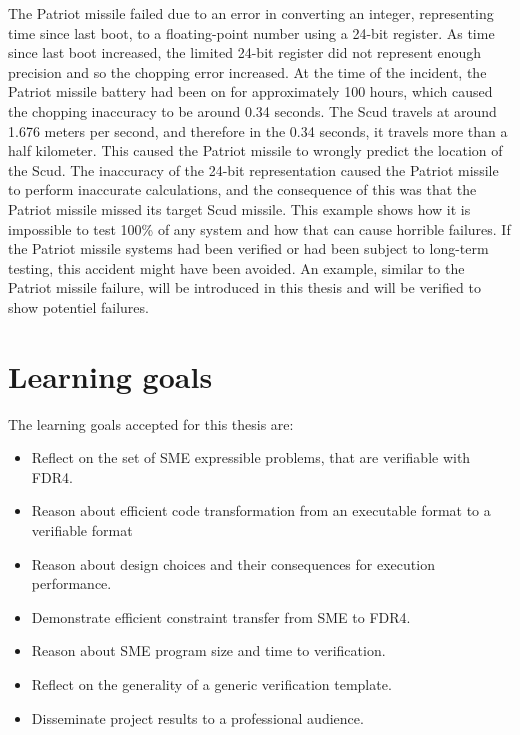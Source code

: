 The Patriot missile failed due to an error in converting an integer, representing time since last boot, to a floating-point number using a 24-bit register. As time since last boot increased, the limited 24-bit register did not represent enough precision and so the chopping error increased. At the time of the incident, the Patriot missile battery had been on for approximately 100 hours, which caused the chopping inaccuracy to be around 0.34 seconds. The Scud travels at around 1.676 meters per second, and therefore in the 0.34 seconds, it travels more than a half kilometer. This caused the Patriot missile to wrongly predict the location of the Scud.
The inaccuracy of the 24-bit representation caused the Patriot missile to perform inaccurate calculations, and the consequence of this was that the Patriot missile missed its target Scud missile. This example shows how it is impossible to test 100\% of any system and how that can cause horrible failures. If the Patriot missile systems had been verified or had been subject to long-term testing, this accident might have been avoided. An example, similar to the Patriot missile failure, will be introduced in this thesis and will be verified to show potentiel failures.
\section{Learning goals}
The learning goals accepted for this thesis are:
\begin{itemize}
\item Reflect on the set of SME expressible problems, that are verifiable with FDR4.
\item Reason about efficient code transformation from an executable format to a verifiable format
\item Reason about design choices and their consequences for execution performance.
\item Demonstrate efficient constraint transfer from SME to FDR4.
\item Reason about SME program size and time to verification.
\item Reflect on the generality of a generic verification template.
\item Disseminate project results to a professional audience.
\end{itemize}




